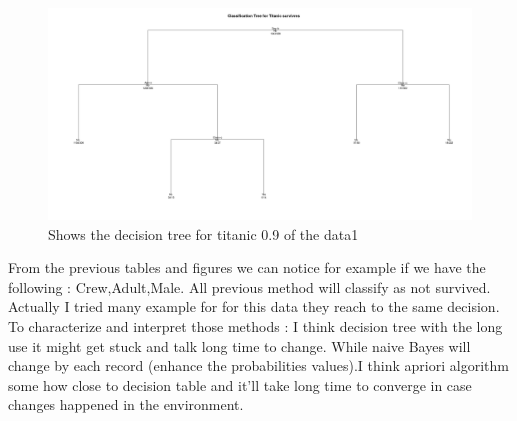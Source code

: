 \documentclass{article}
\begin{document}
\begin{figure}[H]
\includegraphics[scale=0.3]{treetitanic.png}
\caption{Shows the decision tree for titanic 0.9 of the data1}
\end{figure}
From the previous tables and figures we can notice for example if we have the following :
Crew,Adult,Male. All previous method will classify as not survived.\\ Actually I tried many example for for this data they reach to the same decision.\\
To characterize and interpret those methods : I think decision tree with the long use it might get stuck and talk long time to change. While naive Bayes will change by each record (enhance the probabilities values).I think apriori algorithm some how close to decision table and it'll take long time to converge in case changes happened in the environment. 
\end{document}
